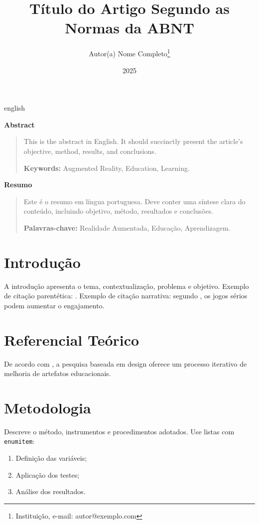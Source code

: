 \documentclass[12pt,oneside]{article}
\title{Título do Artigo Segundo as Normas da ABNT}
\author{Autor(a) Nome Completo\thanks{Instituição, e-mail: autor@exemplo.com}}
\date{2025}
\newenvironment{resumoEng}{%
  \par\vspace{1em}%
  \begin{center}\bfseries Abstract\end{center}%
  \begin{quotation}%
}{\end{quotation}}
\newenvironment{resumoPort}{%
  \par\vspace{1em}%
  \begin{center}\bfseries Resumo\end{center}%
  \begin{quotation}%
}{\end{quotation}}
\begin{document}
\maketitle

\begin{otherlanguage*}{english}
\begin{resumoEng}
This is the abstract in English. It should succinctly present the article’s objective, method, results, and conclusions.

\textbf{Keywords:} Augmented Reality, Education, Learning.
\end{resumoEng}
\end{otherlanguage*}

\begin{resumoPort}
Este é o resumo em língua portuguesa. Deve conter uma síntese clara do conteúdo, incluindo objetivo, método, resultados e conclusões.

\textbf{Palavras-chave:} Realidade Aumentada, Educação, Aprendizagem.
\end{resumoPort}

\section{Introdução}
A introdução apresenta o tema, contextualização, problema e objetivo.  
Exemplo de citação parentética: \cite{albuquerqueToyUserInterfaces2021}.  
Exemplo de citação narrativa: segundo \textcite{aragaoEnsinoProgramacaoPensamento2023}, os jogos sérios podem aumentar o engajamento.
\section{Referencial Teórico}
De acordo com \cite{pimentelDesignScienceResearch2020}, a pesquisa baseada em design oferece um processo iterativo de melhoria de artefatos educacionais.

\section{Metodologia}
Descreve o método, instrumentos e procedimentos adotados.  
Use listas com \texttt{enumitem}:
\begin{enumerate}[label=\alph*)]
  \item Definição das variáveis;
  \item Aplicação dos testes;
  \item Análise dos resultados.
\end{enumerate}
\end{document}

